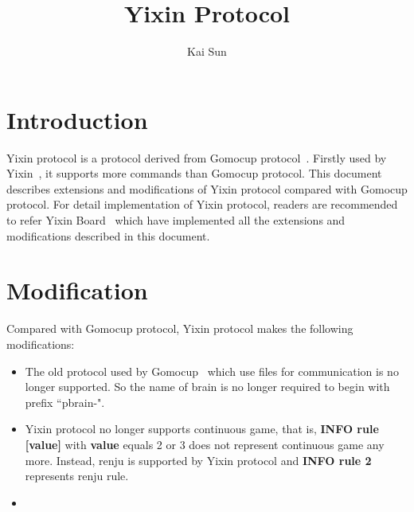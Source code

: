 \documentclass[a4paper,12pt]{article}
\begin{document}
\newtheorem{theorem}{Theorem}[section]
\newtheorem{lemma}{Lemma}[section]
\newtheorem{definition}{Definition}[section]
\newtheorem*{myproof}{Proof}
\newtheorem*{myexercise}{Exercise}
\newtheorem*{myproblem}{Problem}
\author{Kai Sun}
\title{Yixin Protocol}
\maketitle

\section{Introduction}
Yixin protocol is a protocol derived from Gomocup protocol~\cite{gomocup-protocol}. Firstly used by Yixin~\cite{yixin}, it supports more commands than Gomocup protocol. This document describes extensions and modifications of Yixin protocol compared with Gomocup protocol. For detail implementation of Yixin protocol, readers are recommended to refer Yixin Board~\cite{yixin-board} which have implemented all the extensions and modifications described in this document.

\section{Modification}
Compared with Gomocup protocol, Yixin protocol makes the following modifications:
\begin{itemize}
\item The old protocol used by Gomocup~\cite{old-gomocup-protocol} which use files for communication is no longer supported. So the name of brain is no longer required to begin with prefix ``pbrain-".
\item Yixin protocol no longer supports continuous game, that is, \textbf{INFO rule [value]} with \textbf{value} equals 2 or 3 does not represent continuous game any more. Instead, renju is supported by Yixin protocol and \textbf{INFO rule 2} represents renju rule.
\item 
\end{itemize}
\end{document}
